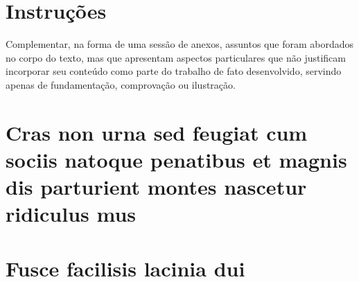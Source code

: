 \documentclass[
	12pt,			%
	openany,			%
	oneside,			%
	a4paper,			%
	english,			%
	french,				%
	spanish,			%
	brazil				%
	]{abntex2}
\begin{document}
\begin{anexosenv}

\partanexos

\chapter{Instruções}
Complementar, na forma de uma sessão de anexos, assuntos que foram abordados no
corpo do texto, mas que apresentam aspectos particulares que não justificam incorporar seu
conteúdo como parte do trabalho de fato desenvolvido, servindo apenas de fundamentação,
comprovação ou ilustração.

\chapter{Cras non urna sed feugiat cum sociis natoque penatibus et magnis dis
parturient montes nascetur ridiculus mus}

\lipsum[31]

\chapter{Fusce facilisis lacinia dui}

\lipsum[32]

\end{anexosenv}

\printindex
\end{document}
